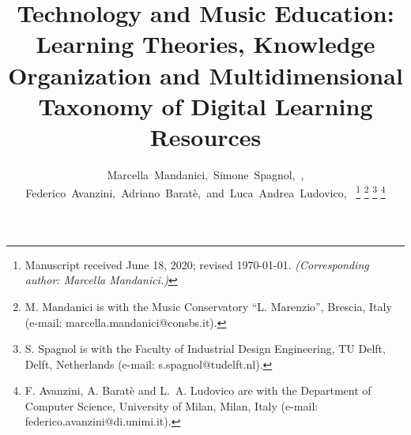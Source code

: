 \documentclass[journal]{IEEEtran}
\begin{document}
%
\title{Technology and Music Education: Learning Theories, Knowledge Organization and Multidimensional Taxonomy of Digital Learning Resources}
%
%
%

\author{Marcella~Mandanici,~Simone~Spagnol,~, Federico~Avanzini,~Adriano~Barat\`e,~and~Luca~Andrea~Ludovico,~%
\thanks{Manuscript received June 18, 2020; revised \today. \textit{(Corresponding author: Marcella Mandanici.)}}
\thanks{M. Mandanici is with the Music Conservatory ``L. Marenzio'', Brescia, Italy (e-mail: marcella.mandanici@consbs.it).}%
\thanks{S. Spagnol is with the Faculty of Industrial Design Engineering, TU Delft, Delft, Netherlands (e-mail: s.spagnol@tudelft.nl).}%
\thanks{F. Avanzini, A. Barat\`e and L.~A. Ludovico are with the Department of Computer Science, University of Milan, Milan, Italy (e-mail: federico.avanzini@di.unimi.it).}%
}

% 
%
\end{document}
